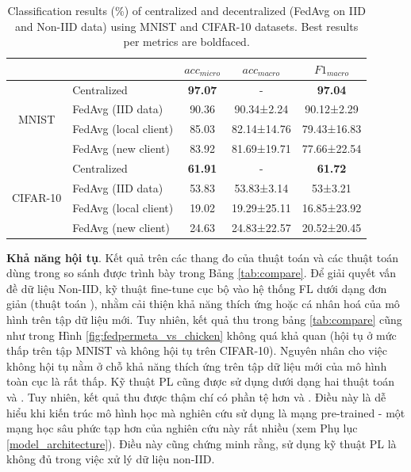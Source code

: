 \documentclass[runningheads]{llncs}
\begin{document}
\begin{table}[h]
    \centering
    \caption{Classification results (\%) of centralized and decentralized (FedAvg on IID and Non-IID data) using MNIST and CIFAR-10 datasets. Best results per metrics are boldfaced.}
    \label{fig:central_decentral}
    \begin{tabular}{c|l|ccc} 
    \toprule
    \multicolumn{1}{c}{}      &                       & $acc_{micro}$  & $acc_{macro}$ & $F1_{macro}$    \\ 
    \hline
    \multirow{4}{*}{MNIST}    & Centralized           & \textbf{97.07} & -             & \textbf{97.04}  \\
                              & FedAvg (IID data)     & 90.36          & 90.34±2.24    & 90.12±2.29      \\
                              & FedAvg (local client) & 85.03          & 82.14±14.76   & 79.43±16.83     \\
                              & FedAvg (new client)   & 83.92          & 81.69±19.71   & 77.66±22.54     \\ 
    \hline
    \multirow{4}{*}{CIFAR-10} & Centralized           & \textbf{61.91} & -             & \textbf{61.72}  \\
                              & FedAvg (IID data)     & 53.83          & 53.83±3.14    & 53±3.21         \\
                              & FedAvg (local client) & 19.02          & 19.29±25.11   & 16.85±23.92     \\
                              & FedAvg (new client)   & 24.63          & 24.83±22.57   & 20.52±20.45     \\
    \bottomrule
    \end{tabular}
\end{table}

\textbf{Khả năng hội tụ}. Kết quả trên các thang đo của thuật toán  và các thuật toán dùng trong so sánh được trình bày trong Bảng \ref{tab:compare}. Để giải quyết vấn đề dữ liệu Non-IID, kỹ thuật fine-tune cục bộ vào hệ thống FL dưới dạng đơn giản (thuật toán ), nhằm cải thiện khả năng thích ứng hoặc cá nhân hoá của mô hình trên tập dữ liệu mới. Tuy nhiên, kết quả thu trong bảng \ref{tab:compare} cũng như trong Hình \ref{fig:fedpermeta_vs_chicken} không quá khả quan (hội tụ ở mức thấp trên tập MNIST và không hội tụ trên CIFAR-10). Nguyên nhân cho việc  không hội tụ nằm ở chỗ khả năng thích ứng trên tập dữ liệu mới của mô hình toàn cục là rất thấp. Kỹ thuật PL cũng được sử dụng dưới dạng hai thuật toán  và . Tuy nhiên, kết quả thu được thậm chí có phần tệ hơn  và . Điều này là dễ hiểu khi kiến trúc mô hình học mà nghiên cứu \cite{arivazhagan2019federated} sử dụng là mạng pre-trained  \cite{howard2017mobilenets} - một mạng học sâu phức tạp hơn của nghiên cứu này rất nhiều (xem Phụ lục \ref{model_architecture}). Điều này cũng chứng minh rằng, sử dụng kỹ thuật PL là không đủ trong việc xử lý dữ liệu non-IID.
\end{document}
